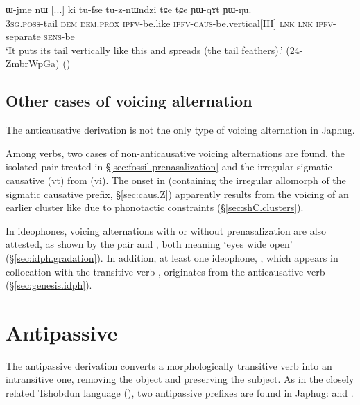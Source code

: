 \begin{exe}
\ex \label{ex:Wjme.YWqAt}
\gll ɯ-jme nɯ [...] ki tu-fse tu-z-nɯndzi tɕe tɕe ɲɯ-qɤt ɲɯ-ŋu. \\
\textsc{3sg}.\textsc{poss}-tail \textsc{dem}  {  }  \textsc{dem}.\textsc{prox} \textsc{ipfv}-be.like \textsc{ipfv}-\textsc{caus}-be.vertical[III] \textsc{lnk} \textsc{lnk} \textsc{ipfv}-separate \textsc{sens}-be \\
\glt `It puts its tail vertically like this and spreads (the tail feathers).' (24-ZmbrWpGa) 	()
\end{exe}

\subsection{Other cases of voicing alternation} \label{sec:voicing.alternation.non.anticausative}
The anticausative derivation is not the only type of voicing alternation in Japhug. 

Among verbs, two cases of non-anticausative voicing alternations are found, the isolated pair treated in §\ref{sec:fossil.prenasalization} and the irregular sigmatic causative  (vt) from  (vi). The onset  in  (containing the irregular  allomorph of the sigmatic causative prefix, §\ref{sec:caus.Z}) apparently results from the voicing of an earlier cluster like   due to phonotactic constraints (§\ref{sec:shC.clusters}). 

In ideophones, voicing alternations with or without prenasalization are also attested, as shown by the pair  and , both meaning `eyes wide open' (§\ref{sec:idph.gradation}). In addition, at least one ideophone, , which appears in collocation with the transitive verb , originates from the anticausative verb  (§\ref{sec:genesis.idph}).

\section{Antipassive} \label{sec:antipassive}
The antipassive derivation converts a morphologically transitive verb into an intransitive one, removing the object and preserving the subject. As in the closely related Tshobdun language (\citealt[8]{jackson06paisheng}), two antipassive prefixes are found in Japhug:  and .



